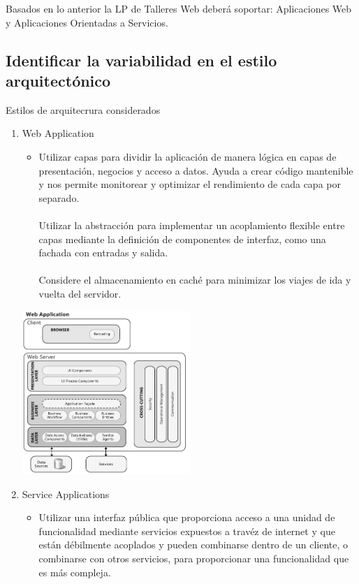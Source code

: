 \documentclass[10pt,a4paper,openany]{book}
\begin{document}
Basados en lo anterior la LP de Talleres Web deberá soportar: Aplicaciones Web y Aplicaciones Orientadas a Servicios.


\subsection{Identificar la variabilidad en el estilo arquitectónico}
Estilos de arquitecrura considerados \cite{url3}


\begin{enumerate}
\item Web Application
\begin{itemize}
	\item Utilizar capas para dividir la aplicación de manera lógica en capas de presentación, negocios y acceso a datos. Ayuda a crear código mantenible y nos permite monitorear y optimizar el rendimiento de cada capa por separado.\\\\
Utilizar la abstracción para implementar un acoplamiento flexible entre capas mediante la definición de componentes de interfaz, como una fachada con entradas y salida.\\\\
Considere el almacenamiento en caché para minimizar los viajes de ida y vuelta del servidor.
\end{itemize}
\begin{center}
\includegraphics[width=0.5\textwidth]{arq1}
\end{center}
\item Service Applications
\begin{itemize}
	\item Utilizar una interfaz pública que proporciona acceso a una unidad de funcionalidad mediante servicios expuestos a travéz de internet y que están débilmente acoplados y pueden combinarse dentro de un cliente, o combinarse con otros servicios, para proporcionar una funcionalidad que es más compleja.\\\\

\end{itemize}
\end{enumerate}
\end{document}
